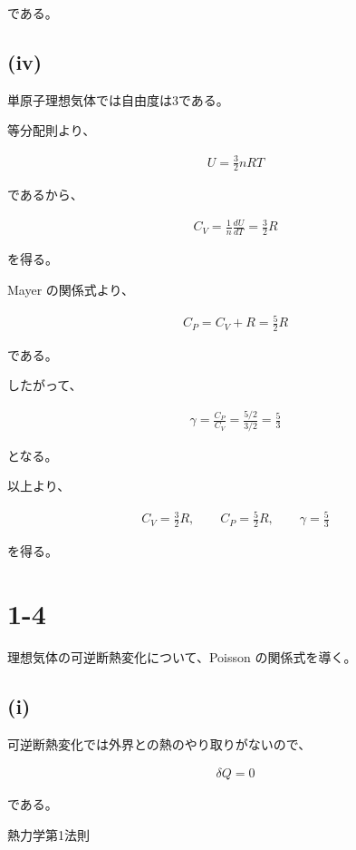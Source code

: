\documentclass[platex,dvipdfmx,a4paper]{jsarticle}
\begin{document}
である。

\subsection{(iv)}

単原子理想気体では自由度は3である。

等分配則より、

\begin{align*}
U
=
\frac{3}{2}nRT
\end{align*}

であるから、

\begin{align*}
C_V
=
\frac{1}{n}
\frac{dU}{dT}
=
\frac{3}{2}R
\end{align*}

を得る。

Mayer の関係式より、

\begin{align*}
C_P
=
C_V+R
=
\frac{5}{2}R
\end{align*}

である。

したがって、

\begin{align*}
\gamma
=
\frac{C_P}{C_V}
=
\frac{5/2}{3/2}
=
\frac{5}{3}
\end{align*}

となる。

以上より、

\begin{align*}
C_V=\frac{3}{2}R,
\qquad
C_P=\frac{5}{2}R,
\qquad
\gamma=\frac{5}{3}
\end{align*}

を得る。
\section{1-4}

理想気体の可逆断熱変化について、Poisson の関係式を導く。

\subsection{(i)}

可逆断熱変化では外界との熱のやり取りがないので、

\begin{align*}
\delta Q=0
\end{align*}

である。

熱力学第1法則
\end{document}
